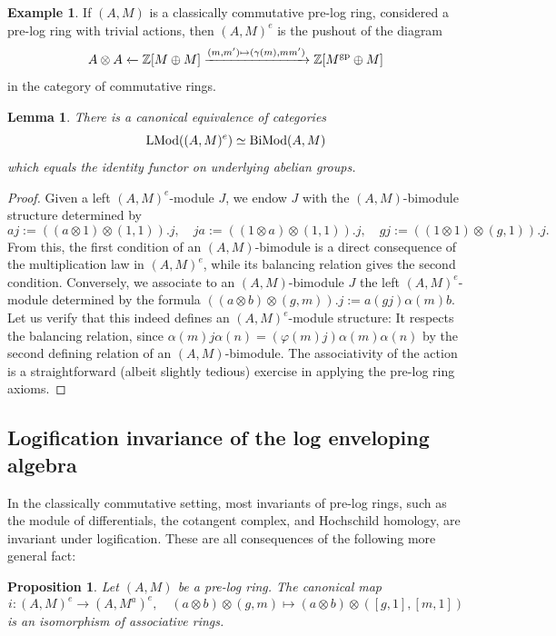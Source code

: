 \documentclass[a4paper,10pt%
]{amsart}
\numberwithin{equation}{section}
\newtheorem{lemma}[subsection]{Lemma}
\newtheorem{proposition}[subsection]{Proposition}
\theoremstyle{definition}
\newtheorem{example}[subsection]{Example}
\renewcommand{\:}{\colon}
\begin{document}
\begin{example} If $(A, M)$ is a classically commutative pre-log ring, considered a pre-log ring with trivial actions, then $(A, M)^e$ is the pushout of the diagram \[A \otimes A \xleftarrow{} {\Bbb Z}[M \oplus M] \xrightarrow{(m, m') \mapsto (\gamma(m), mm')} {\Bbb Z}[M^{\rm gp} \oplus M]\] in the category of commutative rings. 
\end{example}

\begin{lemma}\label{lem:modbimod} There is a canonical equivalence of categories \[{\rm LMod}((A, M)^e) \simeq {\rm BiMod}(A, M)\] which equals the identity functor on underlying abelian groups.  
\end{lemma}

\begin{proof} Given a left $(A, M)^e$-module $J$, we endow $J$ with the $(A, M)$-bimodule structure determined by \[aj := ((a \otimes 1) \otimes (1, 1)).j, \quad ja := ((1 \otimes a) \otimes (1,1)).j, \quad gj := ((1 \otimes 1) \otimes (g, 1)).j.\] From this, the first condition of an $(A, M)$-bimodule is a direct consequence of the multiplication law in $(A, M)^e$, while its balancing relation gives the second condition. Conversely, we associate to an $(A, M)$-bimodule $J$ the left $(A, M)^e$-module determined by the formula $((a \otimes b) \otimes (g, m)).j := a(gj)\alpha(m)b$. Let us verify that this indeed defines an $(A, M)^e$-module structure: It respects the balancing relation, since $\alpha(m)j\alpha(n) = (\varphi(m)j)\alpha(m)\alpha(n)$ by the second defining relation of an $(A, M)$-bimodule. The associativity of the action is a straightforward (albeit slightly tedious) exercise in applying the pre-log ring axioms. 
\end{proof}

\subsection{Logification invariance of the log enveloping algebra} In the classically commutative setting, most invariants of pre-log rings, such as the module of differentials, the cotangent complex, and Hochschild homology, are invariant under logification. These are all consequences of the following more general fact: 


\begin{proposition}\label{prop:logenvlogi} Let $(A, M)$ be a pre-log ring. The canonical map \[i \colon (A, M)^e \to (A, M^a)^e, \quad (a \otimes b) \otimes (g, m) \mapsto (a \otimes b) \otimes ([g, 1], [m, 1])\] is an isomorphism of associative rings. 
\end{proposition}
\end{document}

